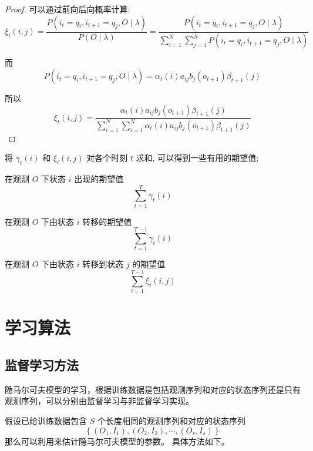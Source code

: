 \begin{proof}
    可以通过前向后向概率计算:
$$
\xi_{t}(i, j)=\frac{P\left(i_{t}=q_{i}, i_{t+1}=q_{j}, O \mid \lambda\right)}{P(O \mid \lambda)}=\frac{P\left(i_{t}=q_{i}, i_{t+1}=q_{j}, O \mid \lambda\right)}{\sum_{i=1}^{N} \sum_{j=1}^{N} P\left(i_{t}=q_{i}, i_{t+1}=q_{j}, O \mid \lambda\right)}
$$

而
$$
P\left(i_{t}=q_{i}, i_{t+1}=q_{j}, O \mid \lambda\right)=\alpha_{t}(i) a_{i j} b_{j}\left(o_{t+1}\right) \beta_{t+1}(j)
$$


所以
$$ \xi_{t}(i, j)=\frac{\alpha_{t}(i) a_{i j} b_{j}\left(o_{t+1}\right) \beta_{t+1}(j)}{\sum_{i=1}^{N} \sum_{i=1}^{N} \alpha_{t}(i) a_{i j} b_{j}\left(o_{t+1}\right) \beta_{t+1}(j)} $$
\end{proof}

将 $ \gamma_{t}(i) $ 和 $ \xi_{i}(i, j) $ 对各个时刻 $ t $ 求和, 可以得到一些有用的期望值;

\begin{theorem}
   在观测 $ O $ 下状态 $ i $ 出现的期望值
$$
\sum_{t=1}^{T} \gamma_{t}(i)
$$ 
\end{theorem}

\begin{theorem}
    在观测 $ O $ 下由状态 $ i $ 转移的期望值
$$
\sum_{t=1}^{T-1} \gamma_{t}(i)
$$
\end{theorem}

\begin{theorem}
    在观测 $ O $ 下由状态 $ i $ 转移到状态 $ j $ 的期望值
$$ \sum_{t=1}^{T-1} \xi_{t}(i, j) $$
\end{theorem}

\section{学习算法}

\subsection{监督学习方法}

隐马尔可夫模型的学习，根据训练数据是包括观测序列和对应的状态序列还是只有观测序列，可以分别由监督学习与非监督学习实现。 

假设已给训练数据包含 $ S $ 个长度相同的观测序列和对应的状态序列 $$ \left\{\left(O_{1}, I_{1}\right),\left(O_{2}, I_{2}\right), \cdots,\left(O_{s}, I_{s}\right)\right\} $$
那么可以利用来估计隐马尔可夫模型的参数。 具体方法如下。

